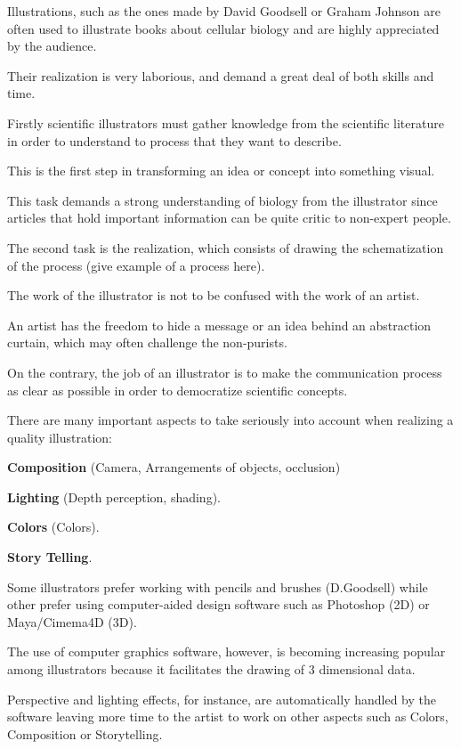 Illustrations, such as the ones made by David Goodsell or Graham Johnson are often used to illustrate books about cellular biology and are highly appreciated by the audience.

Their realization is very laborious, and demand a great deal of both skills and time.

Firstly scientific illustrators must gather knowledge from the scientific literature in order to understand to process that they want to describe.

This is the first step in transforming an idea or concept into something visual.

This task demands a strong understanding of biology from the illustrator since articles that hold important information can be quite critic to non-expert people.

The second task is the realization, which consists of drawing the schematization of the process (give example of a process here).

The work of the illustrator is not to be confused with the work of an artist.

An artist has the freedom to hide a message or an idea behind an abstraction curtain, which may often challenge the non-purists.

On the contrary, the job of an illustrator is to make the communication process as clear as possible in order to democratize scientific concepts.

There are many important aspects to take seriously into account when realizing a quality illustration:

\textbf{Composition} (Camera, Arrangements of objects, occlusion)

\textbf{Lighting} (Depth perception, shading).

\textbf{Colors} (Colors).

\textbf{Story Telling}.

Some illustrators prefer working with pencils and brushes (D.Goodsell) while other prefer using computer-aided design software such as Photoshop (2D) or Maya/Cimema4D (3D).

The use of computer graphics software, however, is becoming increasing popular among illustrators because it facilitates the drawing of 3 dimensional data.

Perspective and lighting effects, for instance, are automatically handled by the software leaving more time to the artist to work on other aspects such as Colors, Composition or Storytelling.

